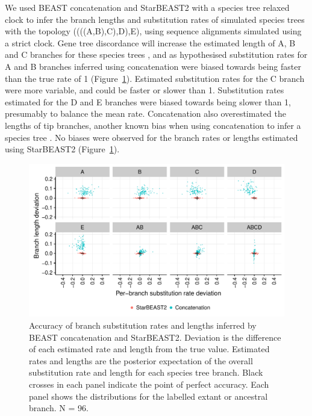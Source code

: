 \documentclass[nogrid]{MBE}%
\begin{document}
We used BEAST concatenation and StarBEAST2 with a species tree relaxed clock
to infer the branch lengths and substitution rates of simulated species trees
with the topology ((((A,B),C),D),E), using sequence alignments simulated using
a strict clock. Gene tree discordance will increase the estimated length of A,
B and C branches for these species trees \citep{Mendes01072016}, and as
hypothesised substitution rates for A and B branches inferred using
concatenation were biased towards being faster than the true rate of 1
(Figure~\ref{fig:spilsRates}). Estimated substitution rates for the C branch
were more variable, and could be faster or slower than 1. Substitution rates
estimated for the D and E branches were biased towards being slower than 1,
presumably to balance the mean rate. Concatenation also overestimated the
lengths of tip branches, another known bias when using concatenation to infer
a species tree \citep{Ogilvie01052016}. No biases were observed for the branch
rates or lengths estimated using StarBEAST2 (Figure~\ref{fig:spilsRates}).

\begin{figure}[htb!]
\centering
\includegraphics[width=130mm]{scatter.pdf}
\caption
{Accuracy of branch substitution rates and lengths inferred by BEAST
concatenation and StarBEAST2. Deviation is the difference of each estimated
rate and length from the true value. Estimated rates and lengths are the
posterior expectation of the overall substitution rate and length for each
species tree branch. Black crosses in each panel indicate the point of perfect
accuracy. Each panel shows the distributions for the labelled extant or
ancestral branch. N = 96.}
\label{fig:spilsRates}
\end{figure}
\end{document}
